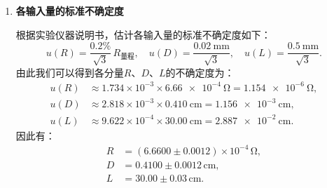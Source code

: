 \documentclass[]{../../templates/Report}%
\begin{document}
\begin{fullreportonly}
\begin{enumerate}
测量模型为
\begin{equation}
    \rho = \frac{\pi D^{2}}{4L}\,R ,
\end{equation}
其中 $R$ 为被测电阻、$D$ 为导体直径、$L$ 为长度。先按对数线性化给出推导过程：
\begin{equation}
    g=\ln\rho=\ln\!\left(\tfrac{\pi}{4}\right)+\ln R+2\ln D-\ln L .
\end{equation}
对小量变化作微分，有
\begin{equation}
    \mathrm{d}g = \frac{\mathrm{d}\rho}{\rho} = \frac{\mathrm{d}R}{R} + 2\frac{\mathrm{d}D}{D} - \frac{\mathrm{d}L}{L} .
\end{equation}
若认为 $R,D,L$ 彼此独立，忽略高阶小量，则方差传播为
\begin{equation}
    u^2(g) = \left(\frac{u(R)}{R}\right)^2 + \left(2\,\frac{u(D)}{D}\right)^2 + \left(\frac{u(L)}{L}\right)^2 .
\end{equation}
又因小量近似 $u(g)\approx u(\rho)/\rho$，故
\begin{equation}
    \left( \frac{u(\rho)}{\rho} \right)^2
    = \left(\frac{u(R)}{R}\right)^2
    + \left(2\,\frac{u(D)}{D}\right)^2
    + \left(\frac{u(L)}{L}\right)^2 .
\end{equation}
注意：$L$ 项的负号在平方后消失；只有当输入量相关时，符号才会通过协方差项影响结果。

因此，可得相对不确定度传播公式
\begin{equation}
    \boxed{\left( \frac{u(\rho)}{\rho} \right)^2
    = \left(\frac{u(R)}{R}\right)^2
    + \left(2\,\frac{u(D)}{D}\right)^2
    + \left(\frac{u(L)}{L}\right)^2}
\end{equation}

\item\textbf{各输入量的标准不确定度}

根据实验仪器说明书，估计各输入量的标准不确定度如下：
\begin{equation}
    u(R) = \frac{0.2\%}{\sqrt{3}}\,R_{\text{量程}},\quad
    u(D) = \frac{\SI{0.02}{\milli\meter}}{\sqrt{3}},\quad
    u(L) = \frac{\SI{0.5}{\milli\meter}}{\sqrt{3}}.
\end{equation}
由此我们可以得到各分量$R$、$D$、$L$的不确定度为：
\begin{align*}
    u(R) &\approx 1.734\times10^{-3} \times \SI{6.66e-4}{\ohm} = \SI{1.154e-6}{\ohm},\\
    u(D) &\approx 2.818\times10^{-3} \times \SI{0.410}{\centi\meter} = \SI{1.156e-3}{\centi\meter},\\
    u(L) &\approx 9.622\times10^{-4} \times \SI{30.00}{\centi\meter} = \SI{2.887e-2}{\centi\meter}.
\end{align*}
因此有：
\begin{align*}
    R&= (6.6600 \pm 0.0012)\times10^{-4}\,\si{\ohm},\\
    D&= 0.4100 \pm 0.0012\,\si{\centi\meter},\\
    L&= 30.00 \pm 0.03\,\si{\centi\meter}.
\end{align*}



\end{enumerate}
\end{fullreportonly}
\end{document}
